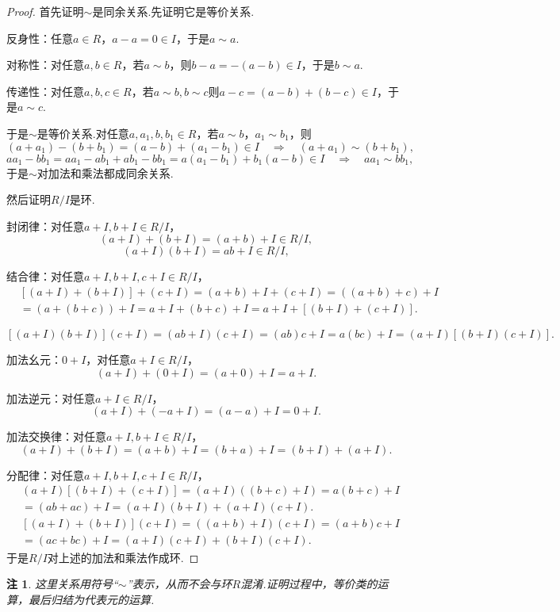 \documentclass[12pt]{ctexart}
\theoremstyle{definition}
\theoremstyle{plain}
\newtheorem*{remark}{注}
\begin{document}
	\begin{proof}
		首先证明$\sim$是同余关系.先证明它是等价关系.
		
		反身性：任意$a\in R$，$a-a=0\in I$，于是$a\sim a$.
		
		对称性：对任意$a,b\in R$，若$a\sim b$，则$b-a=-(a-b)\in I$，于是$b\sim a$.
		
		传递性：对任意$a,b,c\in R$，若$a\sim b,b\sim c$则$a-c=(a-b)+(b-c)\in I$，于是$a\sim c$.
		
		于是$\sim$是等价关系.对任意$a,a_1,b,b_1\in R$，若$a\sim b$，$a_1\sim b_1$，则
		$$(a+a_1)-(b+b_1)=(a-b)+(a_1-b_1)\in I\quad\Rightarrow\quad (a+a_1)\sim(b+b_1),$$
		$$aa_1-bb_1=aa_1-ab_1+ab_1-bb_1=a(a_1-b_1)+b_1(a-b)\in I\quad\Rightarrow\quad aa_1\sim bb_1,$$
		于是$\sim$对加法和乘法都成同余关系.
		
		然后证明$R/I$是环.
		
		封闭律：对任意$a+I,b+I\in R/I$，
		$$(a+I)+(b+I)=(a+b)+I\in R/I,$$
		$$(a+I)(b+I)=ab+I\in R/I,$$
		
		结合律：对任意$a+I,b+I,c+I\in R/I$，
		\begin{equation*}
			\begin{aligned}
				&\left[(a+I)+(b+I)\right]+(c+I)=(a+b)+I+(c+I)=((a+b)+c)+I\\
				&=(a+(b+c))+I=a+I+(b+c)+I=a+I+\left[(b+I)+(c+I)\right].
			\end{aligned}
		\end{equation*}

		$$\left[(a+I)(b+I)\right](c+I)=(ab+I)(c+I)=(ab)c+I=a(bc)+I=(a+I)\left[(b+I)(c+I)\right].$$
		
		加法幺元：$0+I$，对任意$a+I\in R/I$，
		$$(a+I)+(0+I)=(a+0)+I=a+I.$$
		
		加法逆元：对任意$a+I\in R/I$，
		$$(a+I)+(-a+I)=(a-a)+I=0+I.$$
		
		加法交换律：对任意$a+I,b+I\in R/I$，
		$$(a+I)+(b+I)=(a+b)+I=(b+a)+I=(b+I)+(a+I).$$
		
		分配律：对任意$a+I,b+I,c+I\in R/I$，
		\begin{equation*}
			\begin{aligned}
				&(a+I)\left[(b+I)+(c+I)\right]=(a+I)((b+c)+I)=a(b+c)+I\\
				&=(ab+ac)+I=(a+I)(b+I)+(a+I)(c+I).
			\end{aligned}
		\end{equation*}
		\begin{equation*}
			\begin{aligned}
				&\left[(a+I)+(b+I)\right](c+I)=((a+b)+I)(c+I)=(a+b)c+I\\
				&=(ac+bc)+I=(a+I)(c+I)+(b+I)(c+I).
			\end{aligned}
		\end{equation*}
		于是$R/I$对上述的加法和乘法作成环.
	\end{proof}
	\begin{remark}
		这里关系用符号“$\sim$”表示，从而不会与环$R$混淆.证明过程中，等价类的运算，最后归结为代表元的运算.
	\end{remark}
\end{document}
